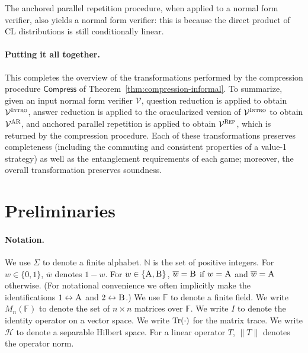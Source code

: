 \documentclass[11pt]{article}
\theoremstyle{definition}
\newcommand{\Tr}{\mbox{\rm Tr}}
\newcommand{\N}{\ensuremath{\mathbb{N}}}
\newcommand{\F}{\ensuremath{\mathbb{F}}}
\newcommand{\mH}{\ensuremath{\mathcal{H}}}
\newcommand{\verifier}{\mathcal{V}}
\newcommand{\gamestyle}[1]{\ensuremath{\textsc{#1}}\xspace}
\newcommand{\ar}{\gamestyle{AR}}
\newcommand{\intro}{\gamestyle{Intro}}
\newcommand{\labelstyle}[1]{\ensuremath{\textsc{#1}}\xspace}
\newcommand{\alice}{\labelstyle{A}}
\newcommand{\bob}{\labelstyle{B}}
\newcommand{\tmstyle}[1]{\ensuremath{\mathsf{#1}}}
\newcommand{\Compress}{\tmstyle{Compress}}
\newcommand{\rep}{\gamestyle{Rep}}
\begin{document}
The anchored parallel repetition procedure, when applied to a normal form verifier, also yields a normal form verifier: this is because the direct product of CL distributions is still conditionally linear. 


\paragraph{Putting it all together.} This completes the overview of the transformations performed by the compression procedure $\Compress$ of Theorem~\ref{thm:compression-informal}. To summarize, given an input normal form verifier $\verifier$, question reduction is applied to obtain $\verifier^\intro$, answer reduction is applied to the oracularized version of $\verifier^\intro$ to obtain $\verifier^\ar$, and  anchored parallel repetition is applied to obtain $\verifier^\rep$, which is returned by the compression procedure. Each of these transformations preserves completeness (including the commuting and consistent properties of a value-1 strategy) as well as the entanglement requirements of each game; moreover, the overall transformation preserves soundness. 

\section{Preliminaries}
\label{sec:prelim}

\paragraph{Notation.}
We use $\Sigma$ to denote a finite alphabet.
$\N$ is the set of positive integers.
For $w\in\{0,1\}$, $\overline{w}$ denotes $1-w$.
For $w\in\{\alice,\bob\}$, $\overline{w}=\bob$ if $w=\alice$ and
$\overline{w}=\alice$ otherwise.
(For notational convenience we often implicitly make the identifications
$1\leftrightarrow \alice$ and $2\leftrightarrow \bob$.)
We use $\F$ to denote a finite field.
We write $M_n(\F)$ to denote the set of $n\times n$ matrices over $\F$.
We write $I$ to denote the identity operator on a vector space.
We write $\Tr(\cdot)$ for the matrix trace.
We write $\mH$ to denote a separable Hilbert space.
For a linear operator $T$, $\|T\|$ denotes the operator norm.
\end{document}

